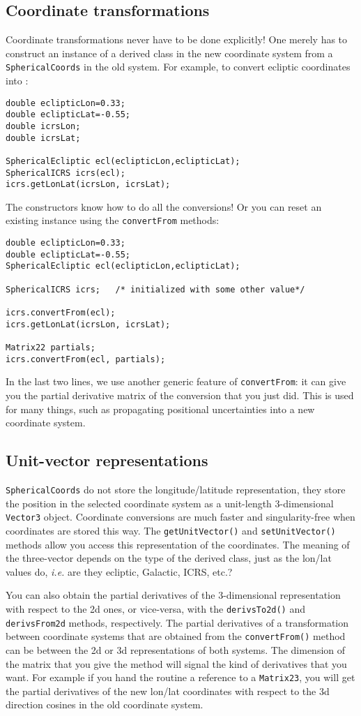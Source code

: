 \documentclass[11pt,preprint,flushrt]{aastex}
\begin{document}
\subsection{Coordinate transformations}
Coordinate transformations never have to be done explicitly! One merely has to construct an instance of a derived class in the new coordinate system from a {\tt SphericalCoords} in the old system.  For example, to convert ecliptic coordinates into :
\begin{verbatim}
double eclipticLon=0.33;
double eclipticLat=-0.55;
double icrsLon;
double icrsLat;

SphericalEcliptic ecl(eclipticLon,eclipticLat);
SphericalICRS icrs(ecl);
icrs.getLonLat(icrsLon, icrsLat);
\end{verbatim}
The constructors know how to do all the conversions!  Or you can reset an existing instance using the {\tt convertFrom} methods:
\begin{verbatim}
double eclipticLon=0.33;
double eclipticLat=-0.55;
SphericalEcliptic ecl(eclipticLon,eclipticLat);

SphericalICRS icrs;   /* initialized with some other value*/

icrs.convertFrom(ecl);
icrs.getLonLat(icrsLon, icrsLat);

Matrix22 partials;
icrs.convertFrom(ecl, partials);
\end{verbatim}
In the last two lines, we use another generic feature of {\tt convertFrom}: it can give you the partial derivative matrix of the conversion that you just did.  This is used for many things, such as propagating positional uncertainties into a new coordinate system.

\subsection{Unit-vector representations}
{\tt SphericalCoords} do not store the longitude/latitude representation, they store the position in the selected coordinate system as a unit-length 3-dimensional {\tt Vector3} object.  Coordinate conversions are much faster and singularity-free when coordinates are stored this way.  The {\tt getUnitVector()} and {\tt setUnitVector()} methods allow you access this representation of the coordinates.  The meaning of the three-vector depends on the type of the derived class, just as the lon/lat values do, {\it i.e.} are they ecliptic, Galactic, ICRS, etc.?

You can also obtain the partial derivatives of the 3-dimensional representation with respect to the 2d ones, or vice-versa, with the {\tt derivsTo2d()} and {\tt derivsFrom2d} methods, respectively.  The partial derivatives of a transformation between coordinate systems that are obtained from the {\tt convertFrom()} method can be between the 2d or 3d representations of both systems.  The dimension of the matrix that you give the method will signal the kind of derivatives that you want.  For example if you hand the routine a reference to a {\tt Matrix23}, you will get the partial derivatives of the new lon/lat coordinates with respect to the 3d direction cosines in the old coordinate system.
\end{document}
